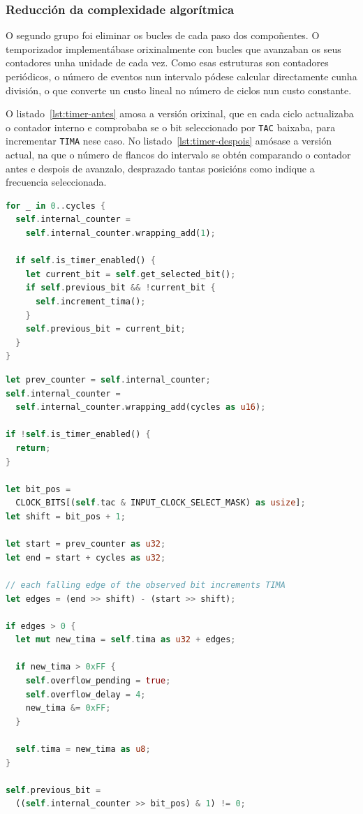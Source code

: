\subsubsection{Reducción da complexidade algorítmica}
O segundo grupo foi eliminar os bucles de cada paso dos compoñentes.
O temporizador implementábase orixinalmente con bucles que avanzaban os seus contadores unha unidade de cada vez.
Como esas estruturas son contadores periódicos, o número de eventos nun intervalo pódese calcular directamente cunha división,
o que converte un custo lineal no número de ciclos nun custo constante.

O listado~\ref{lst:timer-antes} amosa a versión orixinal, que en cada ciclo actualizaba o contador interno
e comprobaba se o bit seleccionado por \texttt{TAC} baixaba, para incrementar \texttt{TIMA} nese caso.
No listado~\ref{lst:timer-despois} amósase a versión actual, na que o número de flancos do intervalo se obtén
comparando o contador antes e despois de avanzalo, desprazado tantas posicións como indique a frecuencia seleccionada.

\begin{lstlisting}[language=Rust, float=tbp, caption={Avance do temporizador ciclo a ciclo}, label={lst:timer-antes}]
for _ in 0..cycles {
  self.internal_counter =
    self.internal_counter.wrapping_add(1);

  if self.is_timer_enabled() {
    let current_bit = self.get_selected_bit();
    if self.previous_bit && !current_bit {
      self.increment_tima();
    }
    self.previous_bit = current_bit;
  }
}
\end{lstlisting}

\begin{lstlisting}[language=Rust, float=tbp, caption={Avance do temporizador en tempo constante}, label={lst:timer-despois}]
let prev_counter = self.internal_counter;
self.internal_counter =
  self.internal_counter.wrapping_add(cycles as u16);

if !self.is_timer_enabled() {
  return;
}

let bit_pos =
  CLOCK_BITS[(self.tac & INPUT_CLOCK_SELECT_MASK) as usize];
let shift = bit_pos + 1;

let start = prev_counter as u32;
let end = start + cycles as u32;

// each falling edge of the observed bit increments TIMA
let edges = (end >> shift) - (start >> shift);

if edges > 0 {
  let mut new_tima = self.tima as u32 + edges;

  if new_tima > 0xFF {
    self.overflow_pending = true;
    self.overflow_delay = 4;
    new_tima &= 0xFF;
  }

  self.tima = new_tima as u8;
}

self.previous_bit =
  ((self.internal_counter >> bit_pos) & 1) != 0;
\end{lstlisting}

